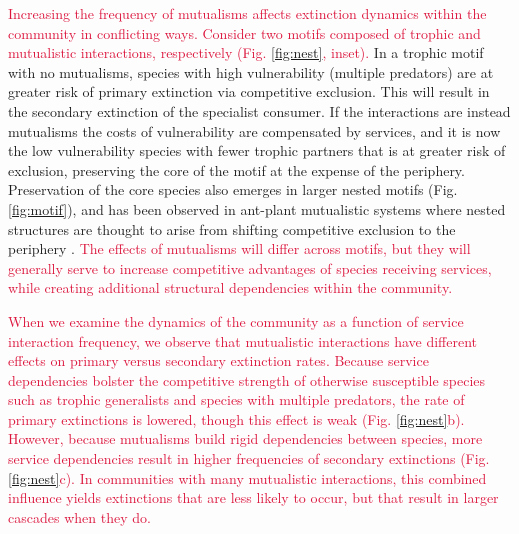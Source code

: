 \documentclass[twocolumn,preprintnumbers,amsmath,amssymb,superscriptaddress,linenumbers]{revtex4-1}
\newcommand{\rev}[1]{\textcolor{crimson}{#1}}
\begin{document}
\rev{Increasing the frequency of mutualisms affects extinction dynamics within the community in conflicting ways.
Consider two motifs composed of trophic and mutualistic interactions, respectively (Fig. \ref{fig:nest}, inset).}
In a trophic motif with no mutualisms, species with high vulnerability (multiple predators) are at greater risk of primary extinction via competitive exclusion. 
This will result in the secondary extinction of the specialist consumer. 
If the interactions are instead mutualisms the costs of vulnerability are compensated by services, and it is now the low vulnerability species with fewer trophic partners that is at greater risk of exclusion, preserving the core of the motif at the expense of the periphery.
Preservation of the core species also emerges in larger nested motifs (Fig. \ref{fig:motif}), and has been observed in ant-plant mutualistic systems where nested structures are thought to arise from shifting competitive exclusion to the periphery \cite{Dattilo2013}.
\rev{The effects of mutualisms will differ across motifs, but they will generally serve to increase competitive advantages of species receiving services, while creating additional structural dependencies within the community.
}

\rev{When we examine the dynamics of the community as a function of service interaction frequency, we observe that mutualistic interactions have different effects on primary versus secondary extinction rates.
Because service dependencies bolster the competitive strength of otherwise susceptible species such as trophic generalists and species with multiple predators, the rate of primary extinctions is lowered, though this effect is weak (Fig. \ref{fig:nest}b).
However, because mutualisms build rigid dependencies between species, more service dependencies result in higher frequencies of secondary extinctions (Fig. \ref{fig:nest}c). 
In communities with many mutualistic interactions, this combined influence yields extinctions that are less likely to occur, but that result in larger cascades when they do.
}
\end{document}
